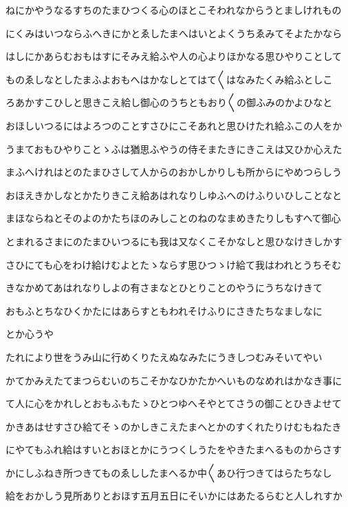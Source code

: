 \documentclass[a4paper,11pt,landscape]{ltjtarticle}
\begin{document}
ねにかやうなるすちのたまひつくる心のほとこそわれなからうとましけれもの
\par\medskip
にくみはいつならふへきにかとゑしたまへはいとよくうちゑみてそよたかなら
\par\medskip
はしにかあらむおもはすにそみえ給ふや人の心よりほかなる思ひやりことして
\par\medskip
ものゑしなとしたまふよおもへはかなしとてはて〱はなみたくみ給ふとしこ
\par\medskip
ろあかすこひしと思きこえ給し御心のうちともおり〱の御ふみのかよひなと
\par\medskip
おほしいつるにはよろつのことすさひにこそあれと思ひけたれ給ふこの人をか
\par\medskip
うまておもひやりことゝふは猶思ふやうの侍そまたきにきこえは又ひか心えた
\par\medskip
まふへけれはとのたまひさして人からのおかしかりしも所からにやめつらしう
\par\medskip
おほえきかしなとかたりきこえ給あはれなりしゆふへのけふりいひしことなと
\par\medskip
まほならねとそのよのかたちほのみしことのねのなまめきたりしもすへて御心
\par\medskip
とまれるさまにのたまひいつるにも我は又なくこそかなしと思ひなけきしかす
\par\medskip
さひにても心をわけ給けむよとたゝならす思ひつゝけ給て我はわれとうちそむ
\par\medskip
きなかめてあはれなりしよの有さまなとひとりことのやうにうちなけきて
\par\medskip
おもふとちなひくかたにはあらすともわれそけふりにさきたちなましなに
\par\medskip
とか心うや
\par\medskip
たれにより世をうみ山に行めくりたえぬなみたにうきしつむみそいてやい
\par\medskip
かてかみえたてまつらむいのちこそかなひかたかへいものなめれはかなき事に
\par\medskip
て人に心をかれしとおもふもたゝひとつゆへそやとてさうの御ことひきよせて
\par\medskip
かきあはせすさひ給てそゝのかしきこえたまへとかのすくれたりけむもねたき
\par\medskip
にやてもふれ給はすいとおほとかにうつくしうたをやきたまへるものからさす
\par\medskip
かにしふねき所つきてものゑししたまへるか中〱あひ行つきてはらたちなし
\par\medskip
給をおかしう見所ありとおほす五月五日にそいかにはあたるらむと人しれすか
\par\medskip
\end{document}
